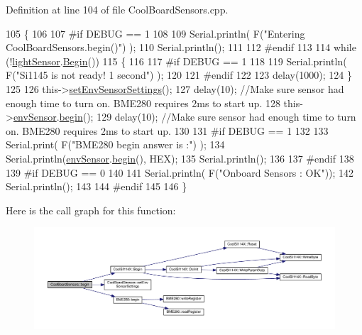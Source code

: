 Definition at line 104 of file Cool\+Board\+Sensors.\+cpp.


\begin{DoxyCode}
105 \{  
106 
107 \textcolor{preprocessor}{#if DEBUG == 1 }
108      
109     Serial.println( F(\textcolor{stringliteral}{"Entering CoolBoardSensors.begin()"}) );
110     Serial.println();
111 
112 \textcolor{preprocessor}{#endif}
113 
114     \textcolor{keywordflow}{while} (!\hyperlink{class_cool_board_sensors_ac711c27d0927eb5e73be77f092c48be0}{lightSensor}.\hyperlink{class_cool_s_i114_x_a206b36aca7049f63be1d11088c30a09f}{Begin}()) 
115     \{
116     
117 \textcolor{preprocessor}{    #if DEBUG == 1}
118 
119         Serial.println( F(\textcolor{stringliteral}{"Si1145 is not ready!  1 second"}) );
120 
121 \textcolor{preprocessor}{    #endif}
122 
123         delay(1000);
124     \}
125      
126     this->\hyperlink{class_cool_board_sensors_a406307ffd70272282d91479c7ed8d66f}{setEnvSensorSettings}();
127     delay(10);  \textcolor{comment}{//Make sure sensor had enough time to turn on. BME280 requires 2ms to start up.}
128     this->\hyperlink{class_cool_board_sensors_a868e38985e9a2412829fa2790ca13e2e}{envSensor}.\hyperlink{class_b_m_e280_a994c102f010547f9c740a338ef9905c7}{begin}();
129     delay(10);  \textcolor{comment}{//Make sure sensor had enough time to turn on. BME280 requires 2ms to start up.}
130 
131 \textcolor{preprocessor}{#if DEBUG == 1 }
132     
133     Serial.print( F(\textcolor{stringliteral}{"BME280 begin answer is :"}) );
134     Serial.println(\hyperlink{class_cool_board_sensors_a868e38985e9a2412829fa2790ca13e2e}{envSensor}.\hyperlink{class_b_m_e280_a994c102f010547f9c740a338ef9905c7}{begin}(), HEX);
135     Serial.println();
136 
137 \textcolor{preprocessor}{#endif}
138 
139 \textcolor{preprocessor}{#if DEBUG == 0}
140 
141     Serial.println( F(\textcolor{stringliteral}{"Onboard Sensors : OK"}));
142     Serial.println();
143 
144 \textcolor{preprocessor}{#endif}
145 
146 \}
\end{DoxyCode}
Here is the call graph for this function\+:\nopagebreak
\begin{figure}[H]
\begin{center}
\leavevmode
\includegraphics[width=350pt]{de/d46/class_cool_board_sensors_a97095823ef7c8f5290812f1405b966b3_cgraph}
\end{center}
\end{figure}
